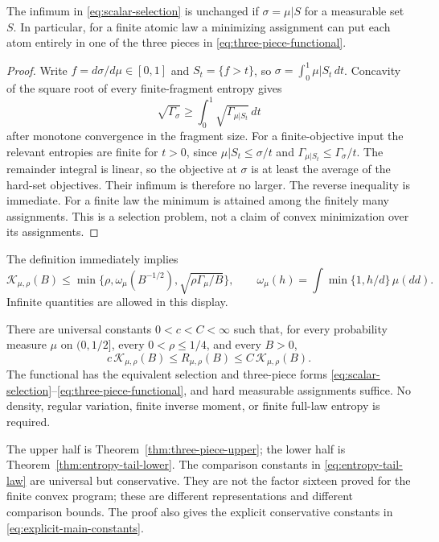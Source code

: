 \begin{lemma}\label{lem:hard-selection}
The infimum in \eqref{eq:scalar-selection} is unchanged if
$\sigma=\mu|S$ for a measurable set $S$. In particular, for a finite
atomic law a minimizing assignment can put each atom entirely in one of
the three pieces in \eqref{eq:three-piece-functional}.
\end{lemma}

\begin{proof}
Write $f=d\sigma/d\mu\in[0,1]$ and $S_t=\{f>t\}$, so
$\sigma=\int_0^1\mu|S_t\,dt$. Concavity of the square root of every
finite-fragment entropy gives
\[
 \sqrt{\Gamma_\sigma}\ge
       \int_0^1\sqrt{\Gamma_{\mu|S_t}}\,dt
\]
after monotone convergence in the fragment size. For a finite-objective
input the relevant entropies are finite for $t>0$, since
$\mu|S_t\le\sigma/t$ and
$\Gamma_{\mu|S_t}\le\Gamma_\sigma/t$. The remainder integral is linear,
so the objective at $\sigma$ is at least the average of the hard-set
objectives. Their infimum is therefore no larger. The reverse inequality
is immediate. For a finite law the minimum is attained among the finitely
many assignments. This is a selection problem, not a claim of convex
minimization over its assignments.
\end{proof}

The definition immediately implies
\[
 \mathcal K_{\mu,\rho}(B)\le
 \min\{\rho,\omega_\mu(B^{-1/2}),
                  \sqrt{\rho\Gamma_\mu/B}\},
 \qquad
 \omega_\mu(h)=\int\min\{1,h/d\}\,\mu(dd).
\]
Infinite quantities are allowed in this display.

\begin{theorem}
\label{thm:entropy-tail-law}
There are universal constants $0<c<C<\infty$ such that, for every
probability measure $\mu$ on $(0,1/2]$, every $0<\rho\le1/4$, and every
$B>0$,
\begin{equation}\label{eq:entropy-tail-law}
 \boxed{\qquad
 c\,\mathcal K_{\mu,\rho}(B)\le R_{\mu,\rho}(B)
             \le C\,\mathcal K_{\mu,\rho}(B).
 \qquad}
\end{equation}
The functional has the equivalent selection and three-piece forms
\eqref{eq:scalar-selection}--\eqref{eq:three-piece-functional}, and hard
measurable assignments suffice. No density, regular variation, finite
inverse moment, or finite full-law entropy is required.
\end{theorem}

The upper half is Theorem~\ref{thm:three-piece-upper}; the lower half is
Theorem~\ref{thm:entropy-tail-lower}. The comparison constants in
\eqref{eq:entropy-tail-law} are universal but conservative. They are not
the factor sixteen proved for the finite convex program; these are
different representations and different comparison bounds.
The proof also gives the explicit conservative constants in
\eqref{eq:explicit-main-constants}.

